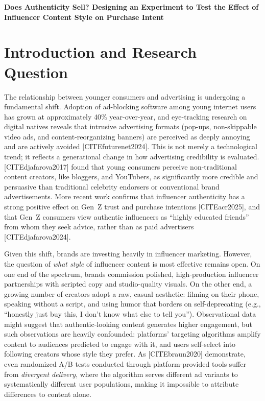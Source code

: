 \documentclass[10pt]{article}
\begin{document}
\newpage 

\textbf{Does Authenticity Sell? Designing an Experiment to Test the Effect of Influencer Content Style on Purchase Intent} 

\section{Introduction and Research Question}

The relationship between younger consumers and advertising is undergoing a fundamental shift. Adoption of ad-blocking software among young internet users has grown at approximately 40\% year-over-year, and eye-tracking research on digital natives reveals that intrusive advertising formats (pop-ups, non-skippable video ads, and content-reorganizing banners) are perceived as deeply annoying and are actively avoided [CITE{futurenet2024}]. This is not merely a technological trend; it reflects a generational change in how advertising credibility is evaluated. [CITE{djafarova2017}] found that young consumers perceive non-traditional content creators, like bloggers, and YouTubers, as significantly more credible and persuasive than traditional celebrity endorsers or conventional brand advertisements. More recent work confirms that influencer authenticity has a strong positive effect on Gen~Z trust and purchase intentions [CITE{acr2025}], and that Gen~Z consumers view authentic influencers as ``highly educated friends'' from whom they seek advice, rather than as paid advertisers [CITE{djafarova2024}].

Given this shift, brands are investing heavily in influencer marketing. However, the question of \textit{what style} of influencer content is most effective remains open. On one end of the spectrum, brands commission polished, high-production influencer partnerships with scripted copy and studio-quality visuals. On the other end, a growing number of creators adopt a raw, casual aesthetic: filming on their phone, speaking without a script, and using humor that borders on self-deprecating (e.g., ``honestly just buy this, I don't know what else to tell you''). Observational data might suggest that authentic-looking content generates higher engagement, but such observations are heavily confounded: platforms' targeting algorithms amplify content to audiences predicted to engage with it, and users self-select into following creators whose style they prefer. As [CITE{braun2020}] demonstrate, even randomized A/B tests conducted through platform-provided tools suffer from \textit{divergent delivery}, where the algorithm serves different ad variants to systematically different user populations, making it impossible to attribute differences to content alone.
\end{document}
